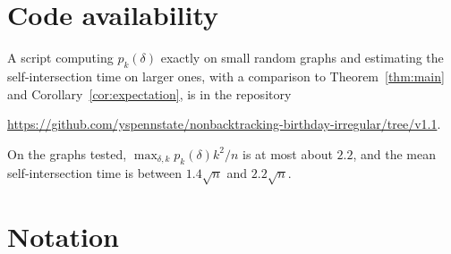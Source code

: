 \documentclass[11pt]{amsart}
\theoremstyle{remark}
\begin{document}
\section*{Code availability}
A script computing $p_k(\delta)$ exactly on small random graphs and estimating the self-intersection time on larger
ones, with a comparison to Theorem~\ref{thm:main} and Corollary~\ref{cor:expectation}, is in the repository
\begin{center}\url{https://github.com/yspennstate/nonbacktracking-birthday-irregular/tree/v1.1}.\end{center}
On the graphs tested, $\max_{\delta,k}p_k(\delta)k^2/n$ is at most about $2.2$, and the mean self-intersection time is
between $1.4\sqrt n$ and $2.2\sqrt n$.

\appendix
\section{Notation}\label{app:notation}
\end{document}
